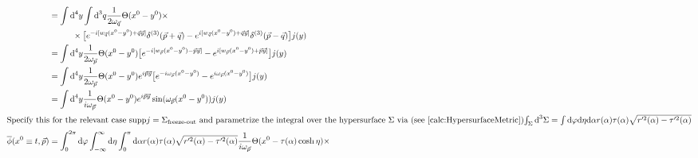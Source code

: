 \begin{subequations}
\begin{align}
                                             & =\int\dt^4y\int\dt^3q\frac{1}{2\omega_{\vec{q}}}\Theta(x^0-y^0)\times\nonumber                                                                                                                                                                                                                                                     \\
                                             & \phantom{=}\qquad\times\big[e^{-\imagu[w_{\vec{q}}(x^0-y^0)+\vec{q}\vec{y}]}\delta^{(3)}(\vec{p}+\vec{q})-e^{\imagu[w_{\vec{q}}(x^0-y^0)+\vec{q}\vec{y}]}\delta^{(3)}(\vec{p}-\vec{q})\big]j(y)                                                                                                                                    \\
                                             & =\int\dt^4y\frac{1}{2\omega_{\vec{p}}}\Theta(x^0-y^0)\big[e^{-\imagu[w_{\vec{p}}(x^0-y^0)-\vec{p}\vec{y}]}-e^{\imagu[w_{\vec{p}}(x^0-y^0)+\vec{p}\vec{y}]}\big]j(y)                                                                                                                                                                \\
                                             & =\int\dt^4y\frac{1}{2\omega_{\vec{p}}}\Theta(x^0-y^0)e^{\imagu\vec{p}\vec{y}}\big[e^{-\imagu\omega_{\vec{p}}(x^0-y^0)}-e^{\imagu\omega_{\vec{p}}(x^0-y^0)}\big]j(y)                                                                                                                                                                \\
                                             & =\int\dt^4y\frac{1}{\imagu\omega_{\vec{p}}}\Theta(x^0-y^0)e^{\imagu\vec{p}\vec{y}}\sin(\omega_{\vec{p}}(x^0-y^0))j(y)                                                                                                                                                                                                              \\
        \intertext{Specify this for the relevant case $\text{supp}j=\Sigma_{\text{freeze-out}}$ and parametrize the integral over the hypersurface $\Sigma$ via (see \eqref{calc:HypersurfaceMetric})$\int_\Sigma\dt^3\Sigma=\int\dt\varphi\dt\eta\dt\alpha r(\alpha)\tau(\alpha)\sqrt{r^{\prime 2}(\alpha)-\tau^{\prime 2}(\alpha)}$}
        \overline{\phi}(x^0\equiv t,\vec{p}) & =\int_0^{2\pi}\dt\varphi\int_{-\infty}^\infty\dt\eta\int_0^\pi\dt\alpha r(\alpha)\tau(\alpha)\sqrt{r^{\prime 2}(\alpha)-\tau^{\prime 2}(\alpha)}\frac{1}{\imagu\omega_{\vec{p}}}\Theta(x^0-\tau(\alpha)\cosh\eta)\times                                                                                                  \nonumber \\

\end{align}
\end{subequations}
